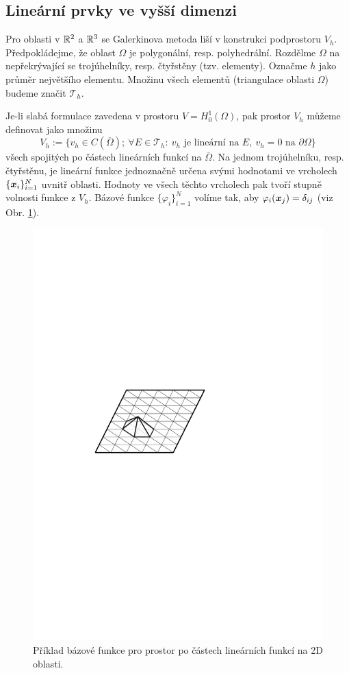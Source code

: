 \subsection{Lineární prvky ve vyšší dimenzi}

Pro oblasti v $\mathbb R^2$ a $\mathbb R^3$ se Galerkinova metoda liší v konstrukci podprostoru $V_h$.
Předpokládejme, že oblast $\Omega$ je polygonální, resp. polyhedrální.
Rozdělme $\Omega$ na nepřekrývající se trojúhelníky, resp. čtyřstěny (tzv. elementy).
Označme $h$ jako průměr největšího elementu.
Množinu všech elementů (triangulace oblasti $\Omega$) budeme značit $\mathcal T_h$.

Je-li slabá formulace zavedena v prostoru $V=H^1_0(\Omega)$, pak prostor $V_h$ můžeme definovat jako množinu
\[ V_h:=\{v_h\in C(\overline\Omega);~\forall E\in\mathcal T_h:~ v_h\mbox{ je lineární na }E,~v_h=0\mbox{ na }\partial\Omega\} \]
všech spojitých po částech lineárních funkcí na $\overline\Omega$.
Na jednom trojúhelníku, resp. čtyřstěnu, je lineární funkce jednoznačně určena svými hodnotami ve vrcholech $\{\mathbf{\boldsymbol{x}}_i\}_{i=1}^N$ uvnitř oblasti.
Hodnoty ve všech těchto vrcholech pak tvoří stupně volnosti funkce z $V_h$.
Bázové funkce $\{\varphi_i\}_{i=1}^N$ volíme tak, aby $\varphi_i(\mathbf{\boldsymbol{x}}_j)=\delta_{ij}$ (viz Obr. \ref{fig:base_2d_lin}).
\begin{figure}[h]
\centering
\includegraphics{base_2d_lin}
\caption{Příklad bázové funkce pro prostor po částech lineárních funkcí na 2D oblasti.}
\label{fig:base_2d_lin}
\end{figure}


